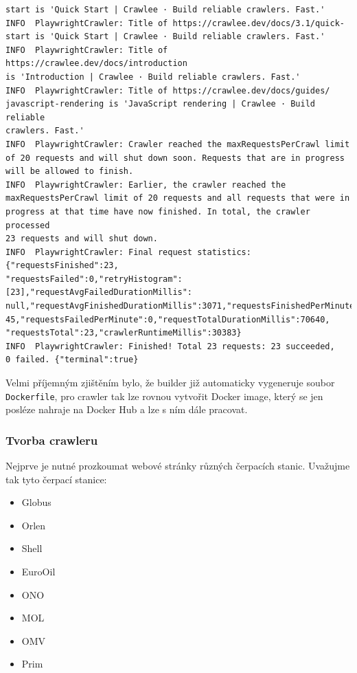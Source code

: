 \begin{verbatim}
start is 'Quick Start | Crawlee · Build reliable crawlers. Fast.'
INFO  PlaywrightCrawler: Title of https://crawlee.dev/docs/3.1/quick-
start is 'Quick Start | Crawlee · Build reliable crawlers. Fast.'
INFO  PlaywrightCrawler: Title of https://crawlee.dev/docs/introduction
is 'Introduction | Crawlee · Build reliable crawlers. Fast.'
INFO  PlaywrightCrawler: Title of https://crawlee.dev/docs/guides/
javascript-rendering is 'JavaScript rendering | Crawlee · Build reliable
crawlers. Fast.'
INFO  PlaywrightCrawler: Crawler reached the maxRequestsPerCrawl limit
of 20 requests and will shut down soon. Requests that are in progress
will be allowed to finish.
INFO  PlaywrightCrawler: Earlier, the crawler reached the
maxRequestsPerCrawl limit of 20 requests and all requests that were in
progress at that time have now finished. In total, the crawler processed
23 requests and will shut down.
INFO  PlaywrightCrawler: Final request statistics: {"requestsFinished":23,
"requestsFailed":0,"retryHistogram":[23],"requestAvgFailedDurationMillis":
null,"requestAvgFinishedDurationMillis":3071,"requestsFinishedPerMinute":
45,"requestsFailedPerMinute":0,"requestTotalDurationMillis":70640,
"requestsTotal":23,"crawlerRuntimeMillis":30383}
INFO  PlaywrightCrawler: Finished! Total 23 requests: 23 succeeded,
0 failed. {"terminal":true}
\end{verbatim}

Velmi příjemným zjištěním bylo, že builder již automaticky vygeneruje
soubor \texttt{Dockerfile}, pro crawler tak lze rovnou vytvořit
Docker image, který se jen posléze nahraje na Docker Hub a lze s ním
dále pracovat.

\subsubsection{Tvorba crawleru}

Nejprve je nutné prozkoumat webové stránky různých čerpacích stanic.
Uvažujme tak tyto čerpací stanice:

\begin{itemize}
    \item Globus
    \item Orlen
    \item Shell
    \item EuroOil
    \item ONO
    \item MOL
    \item OMV
    \item Prim
\end{itemize}

